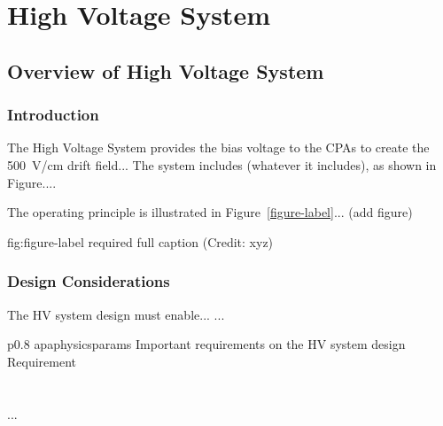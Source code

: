 \chapter{High Voltage System}
\label{ch:fdsp-hv}

\section{Overview of High Voltage System}
\label{sec:fdsp-hv-ov}


\subsection{Introduction}
\label{sec:fdsp-hv-intro}

The High Voltage System provides the bias voltage to the CPAs to create the \SI{500}{V/cm} drift field...
The system includes (whatever it includes), as shown in Figure.... 


The operating principle is illustrated in Figure~\ref{figure-label}... (add figure)

\begin{dunefigure}{fig:figure-label}
{required full caption (Credit: xyz)}
\end{dunefigure}

\subsection{Design Considerations}
\label{sec:fdsp-hv-des-consid}


The HV system design must enable... 
...


\begin{dunetable}
{p{0.8\textwidth}}
{apaphysicsparams}
{Important requirements on the HV system design}   
Requirement  \\ \toprowrule
  \\ \colhline
   \\ \colhline
 ...\\ 
\end{dunetable}

